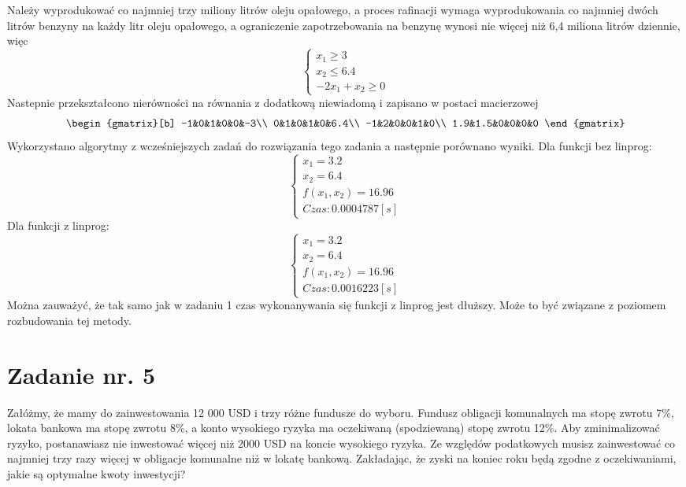 \documentclass{article}
\begin{document}
Należy wyprodukować co najmniej trzy miliony litrów oleju opałowego, a proces rafinacji wymaga wyprodukowania co najmniej dwóch litrów
benzyny na każdy litr oleju opałowego, a ograniczenie zapotrzebowania na benzynę wynosi nie więcej niż 6,4 miliona litrów dziennie, więc
\begin{equation}
    \begin{cases}
        x_1 \geq 3\\
        x_2 \leq 6.4\\
        -2x_1 + x_2 \geq 0
    \end{cases}
\end{equation}
Nastepnie przekształcono nierówności na równania z dodatkową niewiadomą i zapisano w postaci macierzowej
\begin{equation}
  \begin{gmatrix}[b]
    -1&0&1&0&0&-3\\
    0&1&0&1&0&6.4\\
    -1&2&0&0&1&0\\
    1.9&1.5&0&0&0&0
  \end{gmatrix}
\end{equation}
Wykorzystano algorytmy z wcześniejszych zadań do rozwiązania tego zadania a następnie porównano wyniki.
\newline Dla funkcji bez linprog:
\begin{equation}
  \begin{cases}
      x_1 = 3.2\\
      x_2 = 6.4\\
      f(x_1,x_2)=16.96\\
      Czas: 0.0004787[s]
  \end{cases}
\end{equation}
Dla funkcji z linprog:
\begin{equation}
  \begin{cases}
      x_1 = 3.2\\
      x_2 = 6.4\\
      f(x_1,x_2)=16.96\\
      Czas: 0.0016223[s]
  \end{cases}
\end{equation}
Można zauważyć, że tak samo jak w zadaniu 1 czas wykonanywania się funkcji z linprog jest dłuższy. Może to być związane z poziomem rozbudowania tej metody.
\section{Zadanie nr. 5}
Załóżmy, że mamy do zainwestowania 12 000 USD i trzy różne fundusze do 
wyboru. Fundusz obligacji komunalnych ma stopę zwrotu 7\%, lokata bankowa ma stopę zwrotu 
8\%, a konto wysokiego ryzyka ma oczekiwaną (spodziewaną) stopę zwrotu 12\%. Aby 
zminimalizować ryzyko, postanawiasz nie inwestować więcej niż 2000 USD na koncie 
wysokiego ryzyka. Ze względów podatkowych musisz zainwestować co najmniej trzy razy 
więcej w obligacje komunalne niż w lokatę bankową. Zakładając, że zyski na koniec roku będą 
zgodne z oczekiwaniami, jakie są optymalne kwoty inwestycji?
\end{document}
